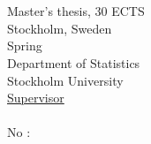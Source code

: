 \makeatletter
{}
\begin{titlepage}
  \AddToShipoutPictureBG*{\AtPageLowerLeft{%
	\color{sublue}\rule{.75\paperwidth}{\paperheight}}}
  \begin{flushright}
   	{\selectfont\color{white}
   	
   	  {\LARGE\@title}\\
   	  \vspace*{5.2cm}
   	  {\Large\@author}\\
   	  \vfill
      {Master's thesis, 30 ECTS}\\
      \vspace*{0.2cm}
      {Stockholm, Sweden}\\
      \vspace*{0.2cm}
      {Spring \thesisyear}\\
      \vfill
      {Department of Statistics}\\
      \vspace{0.2cm}
      {Stockholm University}\\
      \vspace*{2cm}
      {\underline{Supervisor}}\\
      \vspace*{0.2cm}
      {\supervisor}\\
      \vspace*{2cm}
      {\fontsize{18}{22}No \thesisyear:\thesisnumber}\\

    }       
  \end{flushright}
\end{titlepage}
\restoregeometry
\newpage \ \newpage